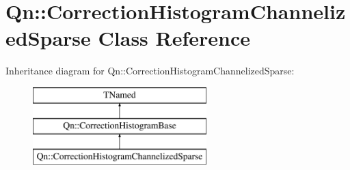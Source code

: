 \hypertarget{classQn_1_1CorrectionHistogramChannelizedSparse}{}\section{Qn\+:\+:Correction\+Histogram\+Channelized\+Sparse Class Reference}
\label{classQn_1_1CorrectionHistogramChannelizedSparse}
Inheritance diagram for Qn\+:\+:Correction\+Histogram\+Channelized\+Sparse\+:\begin{figure}[H]
\begin{center}
\leavevmode
\includegraphics[height=3.000000cm]{classQn_1_1CorrectionHistogramChannelizedSparse}
\end{center}
\end{figure}
